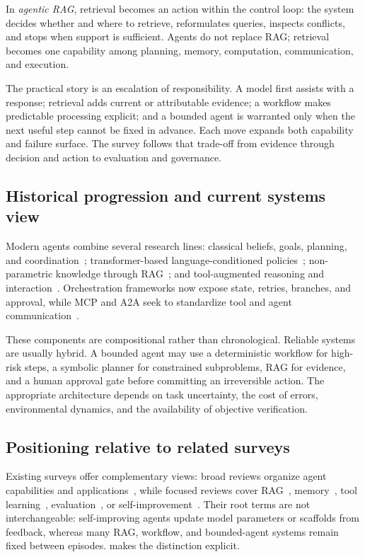 In \emph{agentic RAG}, retrieval becomes an action within the control loop: the system decides whether and where to retrieve, reformulates queries, inspects conflicts, and stops when support is sufficient. Agents do not replace RAG; retrieval becomes one capability among planning, memory, computation, communication, and execution.

The practical story is an escalation of responsibility. A model first assists with a response; retrieval adds current or attributable evidence; a workflow makes predictable processing explicit; and a bounded agent is warranted only when the next useful step cannot be fixed in advance. Each move expands both capability and failure surface. The survey follows that trade-off from evidence through decision and action to evaluation and governance.

\subsection{Historical progression and current systems view}

Modern agents combine several research lines: classical beliefs, goals, planning, and coordination~\cite{rao1995bdi,wooldridge2009multiagent}; transformer-based language-conditioned policies~\cite{vaswani2017attention,brown2020language}; non-parametric knowledge through RAG~\cite{lewis2020rag}; and tool-augmented reasoning and interaction~\cite{nakano2021webgpt,yao2023react,schick2023toolformer}. Orchestration frameworks now expose state, retries, branches, and approval, while MCP and A2A seek to standardize tool and agent communication~\cite{mcp2025spec,a2a2026spec}.

These components are compositional rather than chronological. Reliable systems are usually hybrid. A bounded agent may use a deterministic workflow for high-risk steps, a symbolic planner for constrained subproblems, RAG for evidence, and a human approval gate before committing an irreversible action. The appropriate architecture depends on task uncertainty, the cost of errors, environmental dynamics, and the availability of objective verification.

\subsection{Positioning relative to related surveys}
\label{sec:related-surveys}

Existing surveys offer complementary views: broad reviews organize agent capabilities and applications~\cite{wang2024autonomousagentssurvey,xi2025agentsurvey,plaat2025agenticllms}, while focused reviews cover RAG~\cite{gao2023ragsurvey,singh2025agenticragsurvey}, memory~\cite{zhang2025memorysurvey}, tool learning~\cite{shi2025toollearning}, evaluation~\cite{yehudai2026agentsurveyeval}, or self-improvement~\cite{ren2026selfimprovingagents}. Their root terms are not interchangeable: self-improving agents update model parameters or scaffolds from feedback, whereas many RAG, workflow, and bounded-agent systems remain fixed between episodes.  makes the distinction explicit.

